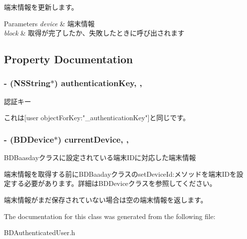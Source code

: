 端末情報を更新します。 


\begin{DoxyParams}{Parameters}
{\em device} & 端末情報 \\
\hline
{\em block} & 取得が完了したか、失敗したときに呼び出されます \\
\hline
\end{DoxyParams}


\subsection{Property Documentation}
\hypertarget{interface_b_d_authenticated_user_adbd855742b73eb440cb118ff190e8851}{
\subsubsection[{authentication\-Key}]{\setlength{\rightskip}{0pt plus 5cm}-\/ (N\-S\-String$\ast$) authentication\-Key\hspace{0.3cm}{\ttfamily [read]}, {\ttfamily [atomic]}, {\ttfamily [assign]}}}\label{interface_b_d_authenticated_user_adbd855742b73eb440cb118ff190e8851}


認証キー 

これは\mbox{[}user object\-For\-Key\-:"\-\_\-authentication\-Key"\mbox{]}と同じです。 \hypertarget{interface_b_d_authenticated_user_a7accdee844c94453ec3d8fd61c7bdc41}{
\subsubsection[{current\-Device}]{\setlength{\rightskip}{0pt plus 5cm}-\/ ({\bf B\-D\-Device}$\ast$) current\-Device\hspace{0.3cm}{\ttfamily [read]}, {\ttfamily [atomic]}, {\ttfamily [assign]}}}\label{interface_b_d_authenticated_user_a7accdee844c94453ec3d8fd61c7bdc41}


B\-D\-Baasdayクラスに設定されている端末\-I\-Dに対応した端末情報 

端末情報を取得する前に\-B\-D\-Baadayクラスのset\-Device\-Id\-:メソッドを端末\-I\-Dを設定する必要があります。詳細は\-B\-D\-Deviceクラスを参照してください。

端末情報がまだ保存されていない場合は空の端末情報を返します。 

The documentation for this class was generated from the following file\-:\begin{DoxyCompactItemize}
\item 
B\-D\-Authenticated\-User.\-h\end{DoxyCompactItemize}
